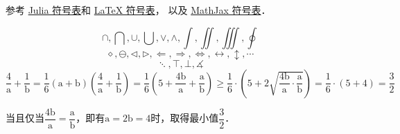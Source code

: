 
参考 \href{https://docs.julialang.org/en/v1/manual/unicode-input/}{Julia 符号表}和 \href{https://oeis.org/wiki/List_of_LaTeX_mathematical_symbols}{LaTeX 符号表}， 以及 \href{http://www.onemathematicalcat.org/MathJaxDocumentation/TeXSyntax.htm#U}{MathJax 符号表}．

\begin{equation}
\cap, \bigcap, \cup, \bigcup, \vee, \wedge, \int, \iint, \iiint, \oint
\end{equation}
\begin{equation}
\diamond, \ominus, \triangleleft, \triangleright, \Longleftarrow, \Longrightarrow, \iff, \leftrightarrow, \updownarrow, \cdots
\end{equation}
\begin{equation}
\ddots, \top, \bot, \measuredangle
\end{equation}
$\dfrac{4}{\mathrm{a}}+\dfrac{1}{\mathrm{b}}=\dfrac{1}{6}(\mathrm{a}+\mathrm{b})(\dfrac{4}{\mathrm{a}}+\dfrac{1}{\mathrm{b}})=\dfrac{1}{6}\left(5+\dfrac{4\mathrm{b}}{\mathrm{a}}+\dfrac{\mathrm{a}}{\mathrm{b}}\right)\geqslant \dfrac{1}{6}\cdot \left(5+2\sqrt{\dfrac{4\mathrm{b}}{\mathrm{a}}\cdot \dfrac{\mathrm{a}}{\mathrm{b}}}\right)=\dfrac{1}{6}\cdot \left(5+4\right)=\dfrac{3}{2}$

当且仅当$\dfrac{4\mathrm{b}}{\mathrm{a}}=\dfrac{\mathrm{a}}{\mathrm{b}}$，即有$\mathrm{a}=2\mathrm{b}=4$时，取得最小值$\dfrac{3}{2}$．